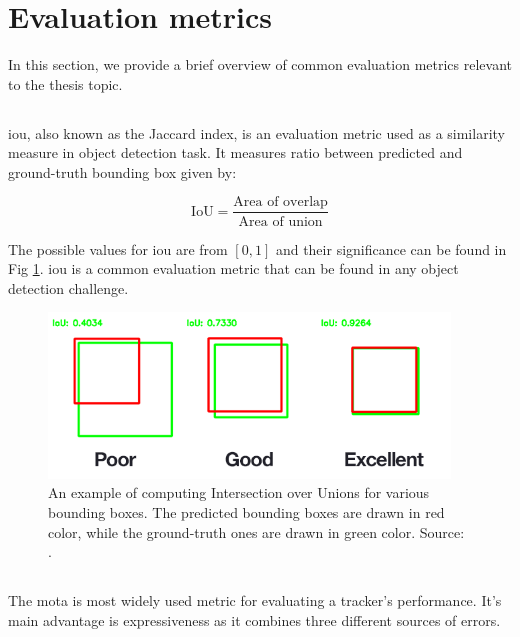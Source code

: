 \section{Evaluation metrics}
    In this section, we provide a brief overview of common evaluation metrics relevant to the thesis topic.
    
    \subsection{}
        \Gls{iou}, also known as the Jaccard index, is an evaluation metric used as a similarity measure in object detection task. It measures ratio between predicted and ground-truth bounding box given by:
        
        \begin{equation}
            \text{IoU} = \frac{\text{Area of overlap}}{\text{Area of union}} 
        \end{equation}
        
        The possible values for \gls{iou} are from $[0, 1]$ and their significance can be found in Fig \ref{fig:iou-examples}. \Gls{iou} is a common evaluation metric that can be found in any object detection challenge.

        \begin{figure}[ht]
            \centering
            \includegraphics[width=0.95\textwidth]{resources/iou_examples.png}
            \caption{An example of computing Intersection over Unions for various bounding boxes. The predicted bounding boxes are drawn in red color, while the ground-truth ones are drawn in green color. Source: \cite{iourosebrock}.}
            \label{fig:iou-examples}
        \end{figure}
        
    \subsection{}
        The \gls{mota} is most widely used metric for evaluating a tracker's performance. It's main advantage is expressiveness as it combines three different sources of errors.
        
